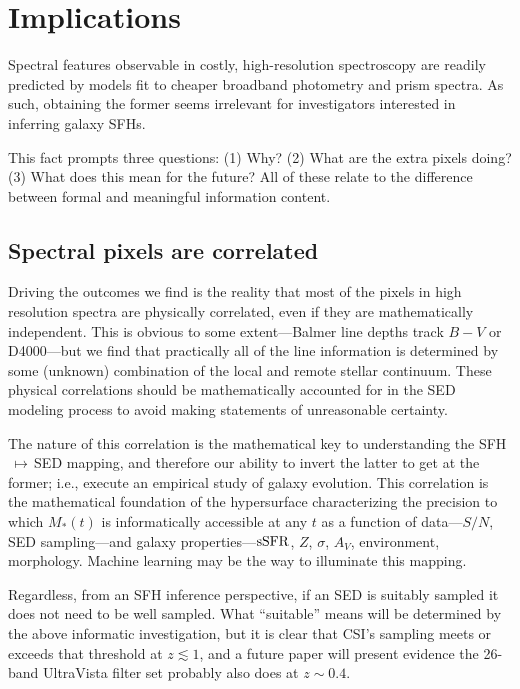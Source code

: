 \documentclass[a4paper,fleqn,usenatbib]{mnras}
\newcommand{\Mstel}{M_\ast}
\newcommand{\ssfr}{{\rm sSFR}}
\begin{document}
\section{Implications}
\label{sec:discussion}

Spectral features observable in costly, high-resolution spectroscopy are readily predicted by 
models fit to cheaper broadband photometry and prism spectra. As such, obtaining the former 
seems irrelevant for investigators interested in inferring galaxy SFHs.

This fact prompts three questions: (1) Why? (2) What are the extra pixels doing? (3) What does
this mean for the future? All of these relate to the difference between formal and meaningful 
information content.

\subsection{Spectral pixels are correlated}
\label{sec:pixels}

Driving the outcomes we find is the reality that most of the pixels in high resolution 
spectra are physically correlated, even if they are mathematically independent. This is obvious to 
some extent---Balmer line depths track $B-V$ or D4000---but we find that practically all of the 
line information is determined by some (unknown) combination of the local and remote stellar 
continuum. These physical correlations should be mathematically accounted for in the SED modeling 
process to avoid making statements of unreasonable certainty.

The nature of this correlation is the mathematical key to understanding the SFH$\,\mapsto\,$SED 
mapping, and therefore our ability to invert the latter to get at the former; i.e., execute an empirical 
study of galaxy evolution. This correlation is the mathematical foundation of the hypersurface 
characterizing the precision to which $\Mstel(t)$ is informatically accessible at any $t$ as a function 
of data---$S/N$, SED sampling---and galaxy properties---$\ssfr$, $Z$, $\sigma$, $A_{V}$, 
environment, morphology. Machine learning may be the way to illuminate this mapping. 

Regardless, from an SFH inference perspective, if an SED is suitably sampled it does not need to be 
well sampled. What ``suitable'' means will be determined by the above informatic investigation, 
but it is clear that CSI's sampling meets or exceeds that threshold at $z\lesssim1$, and a future paper 
will present evidence the 26-band UltraVista filter set  \citep{Muzzin13} probably also does at 
$z\sim0.4$.
\end{document}
